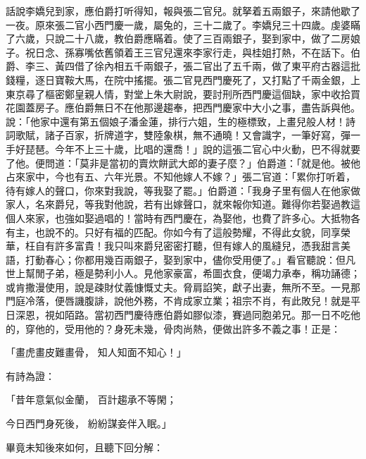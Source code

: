 話說李嬌兒到家，應伯爵打听得知，報與張二官兒。就拏着五兩銀子，來請他歇了一夜。原來張二官小西門慶一歲，屬兔的，三十二歲了。李嬌兒三十四歲。虔婆瞞了六歲，只說二十八歲，教伯爵應瞞着。使了三百兩銀子，娶到家中，做了二房娘子。祝日念、孫寡嘴依舊領着王三官兒還來李家行走，與桂姐打熱，不在話下。伯爵、李三、黃四借了徐內相五千兩銀子，張二官出了五千兩，做了東平府古器這批錢糧，逐日寶鞍大馬，在院中搖擺。張二官見西門慶死了，又打點了千兩金銀，上東京尋了樞密鄭皇親人情，對堂上朱大尉說，要討刑所西門慶這個缺，家中收拾買花園蓋房子。應伯爵無日不在他那邊趨奉，把西門慶家中大小之事，盡告訴與他。說：「他家中還有第五個娘子潘金蓮，排行六姐，生的極標致，上畫兒般人材！詩詞歌賦，諸子百家，折牌道字，雙陸象棋，無不通曉！又會識字，一筆好寫，彈一手好琵琶。今年不上三十歲，比唱的還喬！」說的這張二官心中火動，巴不得就要了他。便問道：「莫非是當初的賣炊餅武大郎的妻子麼？」伯爵道：「就是他。被他占來家中，今也有五、六年光景。不知他嫁人不嫁？」張二官道：「累你打听着，待有嫁人的聲口，你來對我說，等我娶了罷。」伯爵道：「我身子里有個人在他家做家人，名來爵兒，等我對他說，若有出嫁聲口，就來報你知道。難得你若娶過教這個人來家，也強如娶過唱的！當時有西門慶在，為娶他，也費了許多心。大抵物各有主，也說不的。只好有福的匹配。你如今有了這般勢耀，不得此女貌，同享榮華，枉自有許多富貴！我只叫來爵兒密密打聽，但有嫁人的風縫兒，憑我甜言美語，打動春心；你都用幾百兩銀子，娶到家中，儘你受用便了。」看官聽說：但凡世上幫閒子弟，極是勢利小人。見他家豪富，希圖衣食，便竭力承奉，稱功誦德；或肯撒漫使用，說是疎財仗義慷慨丈夫。脅肩諂笑，獻子出妻，無所不至。一見那門庭冷落，便唇譏腹誹，說他外務，不肯成家立業；祖宗不肖，有此敗兒！就是平日深恩，視如陌路。當初西門慶待應伯爵如膠似漆，賽過同胞弟兄。那一日不吃他的，穿他的，受用他的？身死未幾，骨肉尚熱，便做出許多不義之事！正是：

「畫虎畫皮難畫骨，  知人知面不知心！」

有詩為證：

「昔年意氣似金蘭，  百計趨承不等閑；

今日西門身死後，  紛紛謀妾伴入眠。」

畢竟未知後來如何，且聽下回分解：

